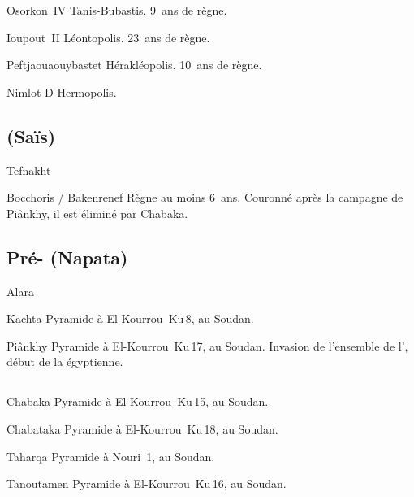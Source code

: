 \begin{listerois}
  \item [Osorkon~IV] Tanis-Bubastis. \num{9}~ans de règne.
  \item [Ioupout~II] Léontopolis. \num{23}~ans de règne.
  \item [Peftjaouaouybastet] Hérakléopolis. \num{10}~ans de règne.
  \item [Nimlot D] Hermopolis.
\end{listerois}

\subsection{\texorpdfstring{}{XXIVe dynastie} (Saïs)}

\begin{listerois}
  \item [Tefnakht \datation{(c.~728/7-720)}]
  \item [Bocchoris / Bakenrenef \datation{(c.~720-715)}]
        Règne au moins \num{6}~ans. Couronné après la campagne de 
        Piânkhy, il est éliminé par Chabaka.
\end{listerois}

\subsection{Pré-\texorpdfstring{}{XXVe dynastie} (Napata)}

\begin{listerois}
  \item [Alara \datation{(c.~785-760)}]
  \item [Kachta \datation{(c.~760-750)}] 
        Pyramide à El-Kourrou~Ku\,8, au Soudan.
  \item [Piânkhy \datation{(c.~750-716)}] 
        Pyramide à El-Kourrou~Ku\,17, au Soudan. Invasion de 
        l'ensemble de l'\kmt, début de la  égyptienne.
\end{listerois}

\subsection{\texorpdfstring{}{XXVe dynastie}}

\begin{listerois}
  \item [Chabaka \datation{(c.~716-702)}] 
        Pyramide à El-Kourrou~Ku\,15, au Soudan.
  \item [Chabataka \datation{(c.~702-690)}] 
        Pyramide à El-Kourrou~Ku\,18, au Soudan.
  \item [Taharqa \datation{(c.~690-664)}] 
        Pyramide à Nouri~\num{1}, au Soudan.
  \item [Tanoutamen \datation{(c.~664-656)}] 
        Pyramide à El-Kourrou~Ku\,16, au Soudan.
\end{listerois}

